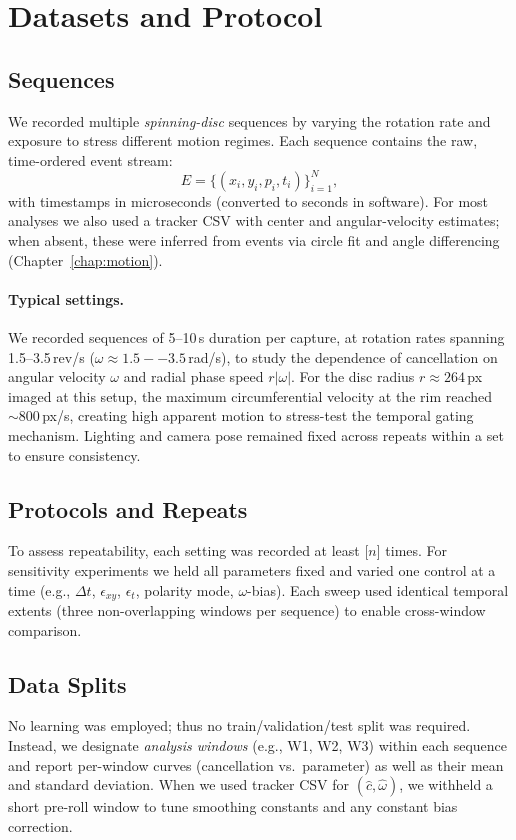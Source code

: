 \section{Datasets and Protocol}
\label{sec:datasets}

\subsection{Sequences}
We recorded multiple \emph{spinning-disc} sequences by varying the rotation rate and exposure to stress different motion regimes. Each sequence contains the raw, time-ordered event stream:
\[
E = \big\{ (x_i, y_i, p_i, t_i) \big\}_{i=1}^{N},
\]
with timestamps in microseconds (converted to seconds in software). For most analyses we also used a tracker CSV with center and angular-velocity estimates; when absent, these were inferred from events via circle fit and angle differencing (Chapter~\ref{chap:motion}).

\paragraph{Typical settings.}
We recorded sequences of 5--10\,s duration per capture, at rotation rates spanning 1.5--3.5\,rev/s ($\omega \approx 1.5--3.5$\,rad/s), to study the dependence of cancellation on angular velocity $\omega$ and radial phase speed $r|\omega|$. For the disc radius $r \approx 264$\,px imaged at this setup, the maximum circumferential velocity at the rim reached $\sim 800$\,px/s, creating high apparent motion to stress-test the temporal gating mechanism. Lighting and camera pose remained fixed across repeats within a set to ensure consistency.

\subsection{Protocols and Repeats}
To assess repeatability, each setting was recorded at least [\textit{$n$}] times. For sensitivity experiments we held all parameters fixed and varied one control at a time (e.g., $\Delta t$, $\epsilon_{xy}$, $\epsilon_t$, polarity mode, $\omega$-bias). Each sweep used identical temporal extents (three non-overlapping windows per sequence) to enable cross-window comparison.

\subsection{Data Splits}
No learning was employed; thus no train/validation/test split was required. Instead, we designate \emph{analysis windows} (e.g., W1, W2, W3) within each sequence and report per-window curves (cancellation vs.\ parameter) as well as their mean and standard deviation. When we used tracker CSV for $(\hat c,\hat\omega)$, we withheld a short pre-roll window to tune smoothing constants and any constant bias correction.

